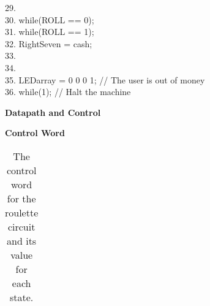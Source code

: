 \begin{description}
{{{                29.     }     \\
                30.     while(ROLL == 0);     \\
                31.     while(ROLL == 1);     \\
                32.     RightSeven = cash;     \\
                33.      \\
            34. }         \\
            35. LEDarray = 0 0 0 1;    // The user is out of money     \\
            36. while(1);        // Halt the machine     \\
        }

        \begin{landscape}
            \textbf{Datapath and Control}
            \begin{figure}[ht]
            \end{figure}

            \pagebreak

            \textbf{ Control Word}

            \begin{table}
                \caption{The control word for the roulette circuit and its value for each state.}
                \label{table:roulette}
                {\small
                    \begin{tabular}{l|l|l|l|l|l|l|l|l|l|l}


\end{tabular}}
\end{table}
\end{landscape}
\end{description}
